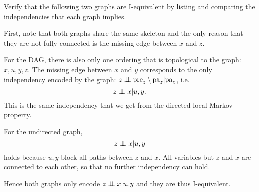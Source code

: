 
\begin{exenumerate}
\item Verify that the following two graphs are I-equivalent by listing and
  comparing the independencies that each graph implies.

\begin{center}
\end{center}

\begin{solution}
  First, note that both graphs share the same skeleton and the only
  reason that they are not fully connected is the missing edge between
  $x$ and $z$.

  For the DAG, there is also only one ordering that is topological to
  the graph: $x, u, y, z$. The missing edge between $x$ and $y$
  corresponds to the only independency encoded by the graph: $z
  \mathrel{\perp\mspace{-10mu}\perp} \mathrm{pre}_z \setminus \mathrm{pa}_z | \mathrm{pa}_z$, i.e.
  $$z \mathrel{\perp\mspace{-10mu}\perp} x | u, y.$$ This is the same independency that we
  get from the directed local Markov property.

  For the undirected graph, 
  $$z \mathrel{\perp\mspace{-10mu}\perp} x | u, y$$ holds because $u, y$ block all paths
  between $z$ and $x$. All variables but $z$ and $x$ are connected to
  each other, so that no further independency can hold.

  Hence both graphs only encode $z \mathrel{\perp\mspace{-10mu}\perp} x | u, y$ and they are
  thus I-equivalent.
  
\end{solution}


\end{exenumerate}
